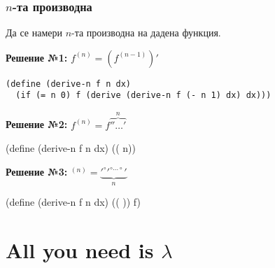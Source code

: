 \documentclass{beamer}
\begin{document}
\begin{frame}[fragile]
  \frametitle{$n$-та производна}

  Да се намери $n$-та производна на дадена функция.

  \vspace{1em}

  \pause

  \textbf{Решение №1:} $f^{(n)} = (f^{(n-1)})'$\pause
\begin{verbatim}
(define (derive-n f n dx)
  (if (= n 0) f (derive (derive-n f (- n 1) dx) dx)))
\end{verbatim}

  \pause

  \textbf{Решение №2:} $f^{(n)} = f\overbrace{''\ldots'}^n$\pause
\begin{semiverbatim}
(define (derive-n f n dx)
  ((  n))
\end{semiverbatim}

  \pause
  \textbf{Решение №3:} $^{(n)} = \underbrace{'^\circ'^{\circ\ldots\circ}'}_n$
\begin{semiverbatim}
(define (derive-n f n dx)
  ((      )) f)
\end{semiverbatim}
\end{frame}

\section{All you need is $\lambda$}
\end{document}

